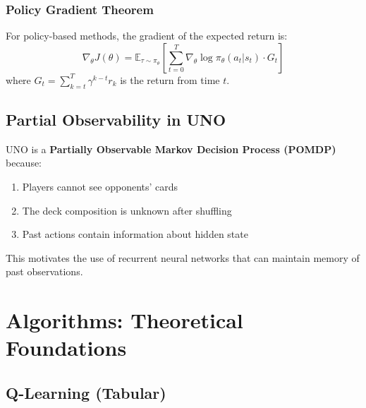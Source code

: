 \documentclass[12pt,a4paper]{article}
\begin{document}
\subsubsection{Policy Gradient Theorem}
For policy-based methods, the gradient of the expected return is:
\begin{equation}
    \nabla_\theta J(\theta) = \mathbb{E}_{\tau \sim \pi_\theta} \left[ \sum_{t=0}^{T} \nabla_\theta \log \pi_\theta(a_t|s_t) \cdot G_t \right]
\end{equation}
where $G_t = \sum_{k=t}^{T} \gamma^{k-t} r_k$ is the return from time $t$.
\subsection{Partial Observability in UNO}
UNO is a \textbf{Partially Observable Markov Decision Process (POMDP)} because:
\begin{enumerate}
    \item Players cannot see opponents' cards
    \item The deck composition is unknown after shuffling
    \item Past actions contain information about hidden state
\end{enumerate}
This motivates the use of recurrent neural networks that can maintain memory of past observations.
\newpage
\section{Algorithms: Theoretical Foundations}
\label{sec:algorithms}
\subsection{Q-Learning (Tabular)}
\label{subsec:qlearning}
\end{document}
